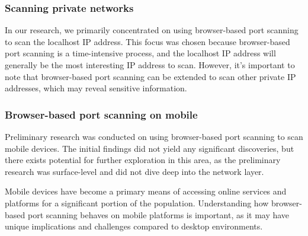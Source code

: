 \subsubsection{Scanning private networks}

In our research, we primarily concentrated on using browser-based port scanning to scan the localhost IP address. This focus was chosen because browser-based port scanning is a time-intensive process, and the localhost IP address will generally be the most interesting IP address to scan. However, it's important to note that browser-based port scanning can be extended to scan other private IP addresses, which may reveal sensitive information.

\subsubsection{Browser-based port scanning on mobile}

Preliminary research was conducted on using browser-based port scanning to scan mobile devices. The initial findings did not yield any significant discoveries, but there exists potential for further exploration in this area, as the preliminary research was surface-level and did not dive deep into the network layer.

Mobile devices have become a primary means of accessing online services and platforms for a significant portion of the population. Understanding how browser-based port scanning behaves on mobile platforms is important, as it may have unique implications and challenges compared to desktop environments.





